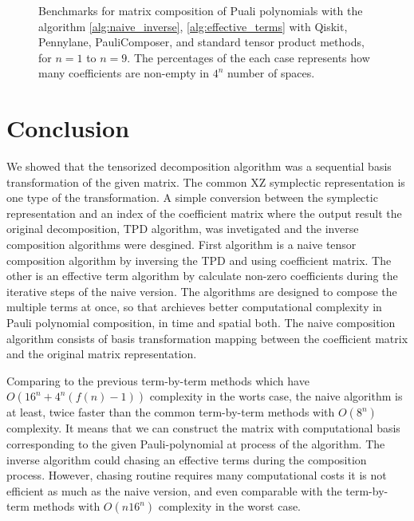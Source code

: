 \documentclass[twocolumn]{article}
\begin{document}
\begin{figure}[ht]
    \caption{Benchmarks for matrix composition of Puali polynomials with the algorithm \ref{alg:naive_inverse}, \ref{alg:effective_terms} with 
    Qiskit, Pennylane, PauliComposer, and standard tensor product methods, for $n=1$ to $n=9$. 
    The percentages of the each case represents how many coefficients are non-empty in $4^n$ number of spaces.}
        \label{fig:results}
\end{figure}

\section{Conclusion}
We showed that the tensorized decomposition algorithm was a 
sequential basis transformation of the given matrix.
The common XZ symplectic representation is one type of the transformation.
A simple conversion between the symplectic representation and an index of the coefficient matrix 
where the output result the original decomposition, TPD algorithm\cite{hantzko_tensorized_2023}, 
was invetigated and the inverse composition algorithms were desgined. 
First algorithm is a naive tensor composition algorithm by inversing the TPD and using coefficient matrix.
The other is an effective term algorithm by calculate non-zero coefficients during the iterative 
steps of the naive version.
The algorithms are designed to compose the multiple terms at once, 
so that archieves better computational complexity in Pauli polynomial composition, in time and spatial both. 
The naive composition algorithm consists of basis transformation mapping between 
the coefficient matrix and the original matrix representation.

Comparing to the previous term-by-term methods which have $O(16^n + 4^n(f(n)-1))$ complexity in the worts case, 
the naive algorithm is at least, twice faster than the common term-by-term methods  with $O(8^n)$ complexity. 
It means that we can construct the matrix with computational basis corresponding to the given 
Pauli-polynomial at process of the algorithm. 
The inverse algorithm could chasing an effective terms during the composition process. 
However, chasing routine requires many computational costs it is not efficient as much as the naive version,
and even comparable with the term-by-term methods with $O(n16^n)$ complexity in the worst case.
\end{document}
